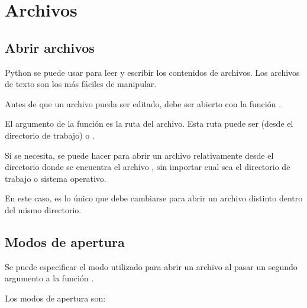 \chapter{Archivos}

\section{Abrir archivos}

Python se puede usar para leer y escribir los contenidos de archivos.
Los archivos de texto son los más fáciles de manipular.

Antes de que un archivo pueda ser editado, debe ser abierto con la función .


El argumento de la función  es la ruta del archivo.
Esta ruta puede ser  (desde el directorio de trabajo) o .

Si se necesita, se puede hacer  para abrir un archivo relativamente desde el directorio donde se encuentra el archivo , sin importar cual sea el directorio de trabajo o sistema operativo.


En este caso,  es lo único que debe cambiarse para abrir un archivo distinto dentro del mismo directorio.

\section{Modos de apertura}

Se puede especificar el modo utilizado para abrir un archivo al pasar un segundo argumento a la función .

Los modos de apertura son:

